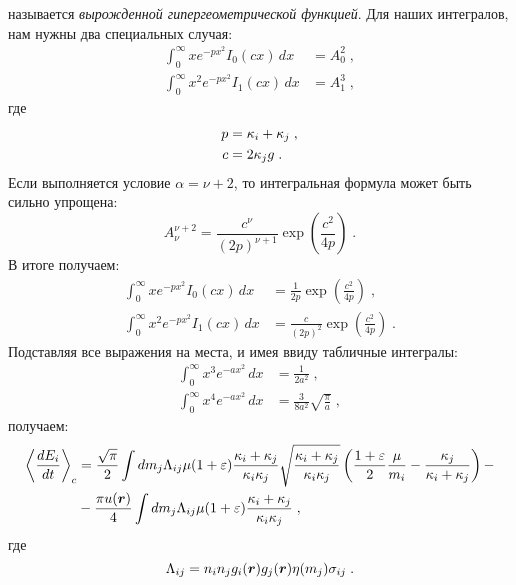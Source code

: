 называется \emph{вырожденной гипергеометрической функцией}. Для наших интегралов, нам нужны два специальных случая:
\begin{equation}
  \begin{split}
    \int_{0}^{\infty}xe^{-px^2}I_0(cx)\,dx &= A^{2}_{0}\;,\\
    \int_{0}^{\infty}x^2e^{-px^2}I_1(cx)\,dx &= A^{3}_{1}\;,
  \end{split}
\end{equation}
где
\begin{equation}
  \begin{split}
    p &= \kappa_i+\kappa_j\;,\\
    c &= 2\kappa_jg\;.
  \end{split}
\end{equation}
Если выполняется условие $\alpha=\nu+2$, то интегральная формула может быть сильно упрощена:
\begin{equation}
  A^{\nu+2}_{\nu} = \frac{c^{\nu}}{(2p)^{\nu+1}}\exp\left(\frac{c^2}{4p}\right)\;.
\end{equation}
В итоге получаем:
\begin{equation}
  \begin{split}
    \int_{0}^{\infty}xe^{-px^2}I_0(cx)\,dx &= \frac{1}{2p}\exp\left(\frac{c^2}{4p}\right)\;,\\
    \int_{0}^{\infty}x^2e^{-px^2}I_1(cx)\,dx &= \frac{c}{(2p)^2}\exp\left(\frac{c^2}{4p}\right)\;.
  \end{split}
\end{equation}
Подставляя все выражения на места, и имея ввиду табличные интегралы:
\begin{equation}
  \begin{split}
    \int_{0}^{\infty}x^3e^{-ax^2}\,dx &= \frac{1}{2a^2}\;,\\
    \int_{0}^{\infty}x^4e^{-ax^2}\,dx &= \frac{3}{8a^2}\sqrt{\frac{\pi}{a}}\;,
  \end{split}
\end{equation}
получаем:
\begin{equation}
  \begin{split}
    \left\langle\frac{dE_i}{dt}\right\rangle_c &= \frac{\sqrt{\pi}}{2}\int dm_j\Lambda_{ij}\mu(1+\varepsilon)
    \frac{\kappa_i+\kappa_j}{\kappa_i\kappa_j}\sqrt{\frac{\kappa_i+\kappa_j}{\kappa_i\kappa_j}}\left(\frac{1+\varepsilon}{2}\frac{\mu}{m_i}
    -\frac{\kappa_j}{\kappa_i+\kappa_j}\right)-\\
    &-\frac{\pi u(\bm{r})}{4}\int dm_j\Lambda_{ij}\mu(1+\varepsilon)\frac{\kappa_i+\kappa_j}{\kappa_i\kappa_j}\;,
  \end{split}
\end{equation}
где
\begin{equation}
  \Lambda_{ij} = n_in_jg_i(\bm{r})g_j(\bm{r})\eta(m_j)\sigma_{ij}\;.
\end{equation}

